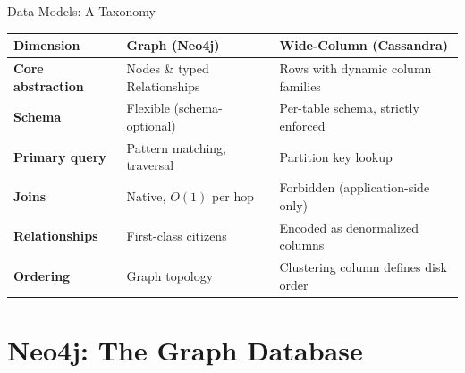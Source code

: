 \documentclass[aspectratio=169]{beamer}
\begin{document}
\begin{frame}{Data Models: A Taxonomy}
  \small
  \begin{center}
    \renewcommand{\arraystretch}{1.4}
    \begin{tabular}{>{\bfseries}p{2.8cm} p{3.8cm} p{4.0cm}}
      \toprule
      \textbf{Dimension} & \textbf{Graph (Neo4j)} & \textbf{Wide-Column (Cassandra)} \\
      \midrule
      Core abstraction & Nodes \& typed Relationships & Rows with dynamic column families \\
      Schema & Flexible (schema-optional) & Per-table schema, strictly enforced \\
      Primary query & Pattern matching, traversal & Partition key lookup \\
      Joins & Native, $O(1)$ per hop & Forbidden (application-side only) \\
      Relationships & First-class citizens & Encoded as denormalized columns \\
      Ordering & Graph topology & Clustering column defines disk order \\
      \bottomrule
    \end{tabular}
  \end{center}
\end{frame}

\section{Neo4j: The Graph Database}
\end{document}
